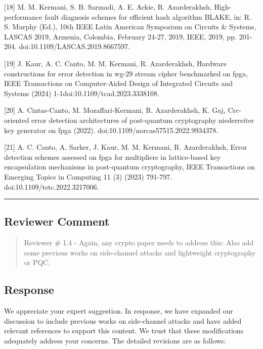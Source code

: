 	[18] M. M. Kermani, S. B. Sarmadi, A. E. Ackie, R. Azarderakhsh, High-performance fault diagnosis schemes for efficient hash algorithm BLAKE, in: R. S. Murphy (Ed.), 10th IEEE Latin American Symposium on Circuits \& Systems, LASCAS 2019, Armenia, Colombia, February 24-27, 2019, IEEE, 2019, pp. 201-204. doi:10.1109/LASCAS.2019.8667597.

[19] J. Kaur, A. C. Canto, M. M. Kermani, R. Azarderakhsh, Hardware constructions for error detection in wg-29 stream cipher benchmarked on fpga, IEEE Transactions on Computer-Aided Design of Integrated Circuits and Systems (2024) 1-1doi:10.1109/tcad.2023.3338108.

[20] A. Cintas-Canto, M. Mozaffari-Kermani, R. Azarderakhsh, K. Gaj, Crc-oriented error detection architectures of post-quantum cryptography niederreiter key generator on fpga (2022). doi:10.1109/norcas57515.2022.9934378.

[21] A. C. Canto, A. Sarker, J. Kaur, M. M. Kermani, R. Azarderakhsh, Error detection schemes assessed on fpga for multipliers in lattice-based key encapsulation mechanisms in post-quantum cryptography, IEEE Transactions on Emerging Topics in Computing 11 (3) (2023) 791-797. doi:10.1109/tetc.2022.3217006.

\color{black}

\noindent\rule{\linewidth}{2.0pt}

\subsection{Reviewer Comment}
\begin{mdframed}
	\begin{quote}
		Reviewer \# 1.4 - Again, any crypto paper needs to address this: Also add some previous works on side-channel attacks and lightweight cryptography or PQC.
	\end{quote}
\end{mdframed}

\subsection{Response}

We appreciate your expert suggestion. In response, we have expanded our discussion to include previous works on side-channel attacks and have added relevant references to support this content. We trust that these modifications adequately address your concerns. The detailed revisions are as follows:


